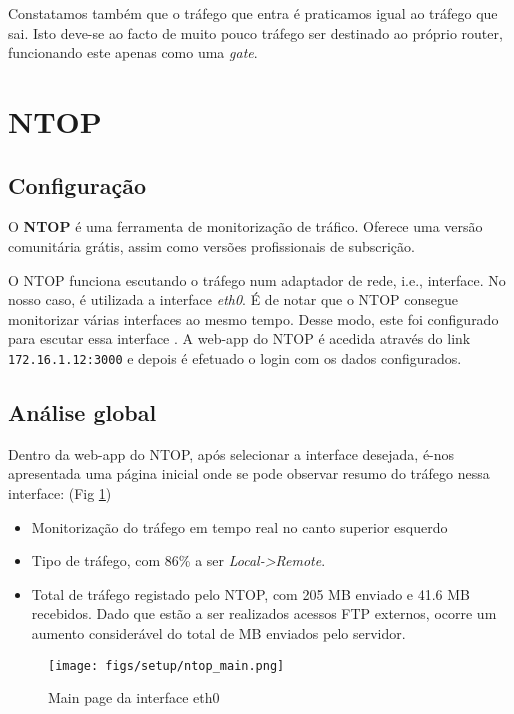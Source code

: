 Constatamos também que o tráfego que entra é praticamos igual ao tráfego que sai. 
Isto deve-se ao facto de muito pouco tráfego ser destinado ao próprio router, funcionando este apenas como uma \textit{gate}.

\section{NTOP}

\subsection{Configuração}

O \textbf{NTOP} é uma ferramenta de monitorização de tráfico. Oferece uma versão comunitária grátis, assim como versões profissionais de subscrição.

O NTOP funciona escutando o tráfego num adaptador de rede, i.e., interface. No nosso caso, é utilizada a interface \textit{eth0}. É de notar que o NTOP consegue monitorizar várias interfaces ao mesmo tempo.
Desse modo, este foi configurado para escutar essa interface \cite{ntop}. A web-app do NTOP é acedida através do link \verb|172.16.1.12:3000| e depois é efetuado o login com os dados configurados.

\subsection{Análise global}

Dentro da web-app do NTOP, após selecionar a interface desejada, é-nos apresentada uma página inicial onde se pode observar resumo do tráfego nessa interface: (Fig \ref{fig:ntop_main})
\begin{itemize}
    \item Monitorização do tráfego em tempo real no canto superior esquerdo
    \item Tipo de tráfego, com 86\% a ser \textit{Local->Remote}.
    \item Total de tráfego registado pelo NTOP, com 205 MB enviado e 41.6 MB recebidos. Dado que estão a ser realizados acessos FTP externos, ocorre um aumento considerável do total de MB enviados pelo servidor.
\end{itemize}

\begin{figure}
    \centering
    \texttt{[image: figs/setup/ntop\_main.png]}
    \caption{Main page da interface eth0}
    \label{fig:ntop_main}
\end{figure}

